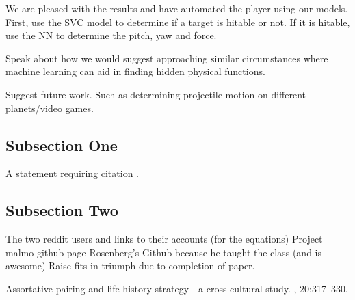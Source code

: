 \documentclass[twoside,twocolumn]{article}
\begin{document}
We are pleased with the results and have automated the player using our models.
First, use the SVC model to determine if a target is hitable or not. If it is hitable, use the NN to determine the pitch, yaw and force.

Speak about how we would suggest approaching similar circumstances where machine learning can aid in finding hidden physical functions.

Suggest future work. Such as determining projectile motion on different planets/video games.

\subsection{Subsection One}

A statement requiring citation \cite{Figueredo:2009dg}.
\blindtext %

\subsection{Subsection Two}

\blindtext %


\begin{thebibliography}{99} %

The two reddit users and links to their accounts (for the equations)
Project malmo github page
Rosenberg's Github because he taught the class (and is awesome)
Raise fits in triumph due to completion of paper.

\newblock Assortative pairing and life history strategy - a cross-cultural
  study.
, 20:317--330.
 
\end{thebibliography}

\end{document}

